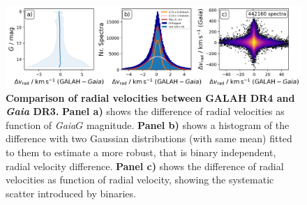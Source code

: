 \documentclass[
  journal=pasa,
  manuscript=research-paper, %
  year=2023,
  volume=37
]{cup-journal}
\newcommand{\Gaia}{\textit{Gaia}\xspace}
\begin{document}
\begin{figure}[ht]
 \centering
 \includegraphics[width=\textwidth]{figures/galah_dr4_vrad_gaia_dr3.png}
 \caption{\textbf{Comparison of radial velocities between GALAH DR4 and \Gaia DR3.}
 \textbf{Panel a)} shows the difference of radial velocities as function of \Gaia $G$ magnitude.
 \textbf{Panel b)} shows a histogram of the difference with two Gaussian distributions (with same mean) fitted to them to estimate a more robust, that is binary independent, radial velocity difference.
 \textbf{Panel c)} shows the difference of radial velocities as function of radial velocity, showing the systematic scatter introduced by binaries.
}
 \label{fig:galah_dr4_vrad_gaia_dr3}
\end{figure}
\end{document}
